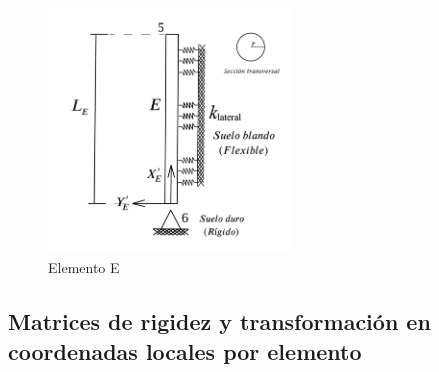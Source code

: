 \documentclass[a4paper]{article}
\begin{document}
\begin{figure}[H]
\centering
    \includegraphics[width=6.5cm]{Elementos/Elemento_E.png}
    \caption{Elemento E}
\end{figure}
\vspace{1 cm}
\subsection{Matrices de rigidez y transformación en coordenadas locales por elemento}\\
\end{document}
